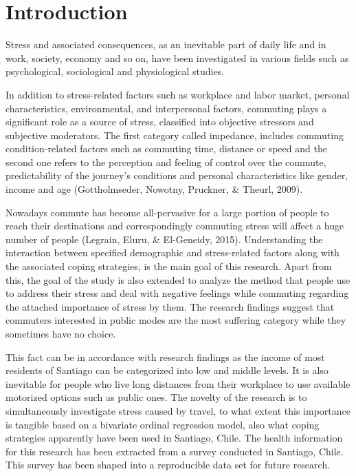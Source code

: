 \documentclass[
11pt, %
oneside, %
english, %
singlespacing, %
]{macthesis} %
\begin{document}
\hypertarget{introduction-1}{%
\section{Introduction}\label{introduction-1}}

Stress and associated consequences, as an inevitable part of daily life and in work, society, economy and so on, have been investigated in various fields such as psychological, sociological and physiological studies.

In addition to stress-related factors such as workplace and labor market, personal characteristics, environmental, and interpersonal factors, commuting plays a significant role as a source of stress, classified into objective stressors and subjective moderators. The first category called impedance, includes commuting condition-related factors such as commuting time, distance or speed and the second one refers to the perception and feeling of control over the commute, predictability of the journey's conditions and personal characteristics like gender, income and age (Gottholmseder, Nowotny, Pruckner, \& Theurl, 2009).

Nowadays commute has become all-pervasive for a large portion of people to reach their destinations and correspondingly commuting stress will affect a huge number of people (Legrain, Eluru, \& El-Geneidy, 2015). Understanding the interaction between specified demographic and stress-related factors along with the associated coping strategies, is the main goal of this research. Apart from this, the goal of the study is also extended to analyze the method that people use to address their stress and deal with negative feelings while commuting regarding the attached importance of stress by them. The research findings suggest that commuters interested in public modes are the most suffering category while they sometimes have no choice.

This fact can be in accordance with research findings as the income of most residents of Santiago can be categorized into low and middle levels. It is also inevitable for people who live long distances from their workplace to use available motorized options such as public ones. The novelty of the research is to simultaneously investigate stress caused by travel, to what extent this importance is tangible based on a bivariate ordinal regression model, also what coping strategies apparently have been used in Santiago, Chile. The health information for this research has been extracted from a survey conducted in Santiago, Chile. This survey has been shaped into a reproducible data set for future research.
\end{document}
